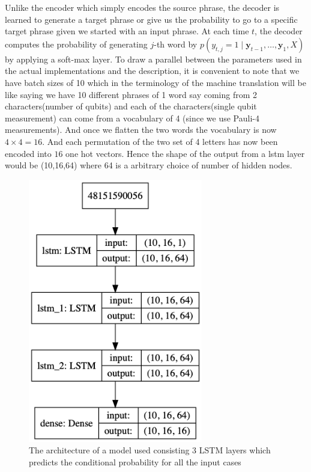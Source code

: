 \documentclass[a4paper]{article}
\newcommand{\vect}[1]{\mathbf{#1}}
\newcommand{\vy}[0]{\vect{y}}
\begin{document}
Unlike the encoder which simply encodes the source phrase, the
decoder is learned to generate a target phrase or give us the probability to go to a specific target phrase given we started with an input phrase. At each time $t$,
the decoder computes the probability of generating $j$-th word by $p(y_{t,j} = 1 \mid \vy_{t-1}, \dots, \vy_1, X)$ by applying a soft-max layer.
To draw a parallel between the parameters used in the actual implementations and the description, it is convenient to note that we have batch sizes of 10 which in the terminology of the machine translation will be like saying we have 10 different phrases of 1 word  say coming from 2 characters(number of qubits) and each of the characters(single qubit measurement) can come from a vocabulary of 4 (since we use Pauli-4 measurements). And once we flatten the two words the vocabulary is now $4\times4=16$. And each permutation of the two set of 4 letters has now been encoded into $16$ one hot vectors. Hence the shape of the output from a lstm layer would be (10,16,64) where 64 is a arbitrary choice of number of hidden nodes.
\begin{figure}[H]
    \centering
    \includegraphics[width=3.0in]{model.png}
    \caption{The architecture of a model used consisting 3 LSTM layers which predicts the conditional probability for all the input cases}
    \label{fig:my_mdoel}
\end{figure}
\end{document}
